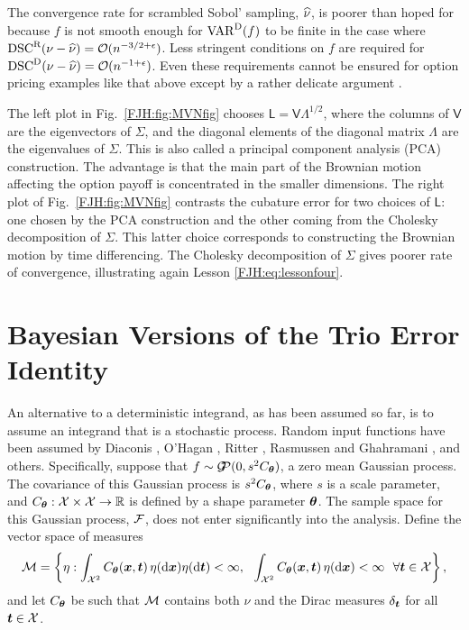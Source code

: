\documentclass[graybox,footinfo]{svmult}
\DeclareMathOperator{\disc}{DSC}
\DeclareMathOperator{\Var}{VAR}
\DeclareMathOperator{\GP}{\cg\!\!\cp}
\begin{document}
The convergence rate for scrambled Sobol' sampling, $\widehat{\nu}$,  is poorer than hoped for 
because 
$f$ is not smooth enough for $\Var^{\Dt}(f)$ to be finite in the case 
where $\disc^\Rn(\nu - \hnu) = \Order(n^{-3/2 +\epsilon})$.  Less 
stringent conditions on $f$ are required for $\disc^\Dt(\nu - \hnu) = 
\Order(n^{-1 +\epsilon})$.  Even these requirements cannot 
be ensured for option pricing examples like that above except by a rather delicate 
argument \cite{GriKuoSlo10, GriKuoSlo16}.

\begin{FJHLesson}
	\FJHLessonFive
\end{FJHLesson}

The left plot in Fig.\ \ref{FJH:fig:MVNfig} chooses $\mathsf{L} = 
\mathsf{V}\mathsf{\Lambda}^{1/2}$, where the columns of $\mathsf{V}$ are the 
eigenvectors of $\mathsf{\Sigma}$, and the diagonal elements of the diagonal matrix  
$\mathsf{\Lambda}$ are the eigenvalues of $\mathsf{\Sigma}$.  This is also called a 
principal component analysis (PCA) construction.  The advantage is that the main part of 
the 
Brownian motion affecting the option payoff is concentrated in the smaller dimensions.  
The right plot of Fig.\ 
\ref{FJH:fig:MVNfig} contrasts the cubature error for two choices of  $\mathsf{L}$:  one 
chosen by the PCA construction and the other coming from the Cholesky decomposition 
of $\mathsf{\Sigma}$.  This latter choice corresponds to constructing the Brownian 
motion by time 
differencing.  The Cholesky decomposition of $\mathsf{\Sigma}$ gives poorer rate of 
convergence, illustrating again Lesson \ref{FJH:eq:lessonfour}.


\section{Bayesian Versions of the Trio Error Identity}
An alternative to a deterministic integrand, as has been assumed so far, is to assume an 
integrand that is a stochastic process.  Random input functions have been assumed by 
Diaconis \cite{Dia88a}, O'Hagan \cite{OHa91a}, Ritter \cite{Rit00a}, Rasmussen and 
Ghahramani \cite{RasGha03a}, and others. Specifically, suppose that $f \sim \GP (0, 
s^2C_{\bstheta})$, a zero mean Gaussian process.  The covariance of 
this  Gaussian process is $s^2C_{{\boldsymbol{\theta}}}$, where $s$ is a scale parameter, and 
$C_{{\boldsymbol{\theta}}}:\mathcal{X} \times \mathcal{X} \to {\mathbb{R}}$ is defined by a shape parameter ${\boldsymbol{\theta}}$.  The 
sample space for this Gaussian process, ${\mathcal{F}}$, does not enter significantly into the 
analysis.  Define the vector space of measures 
\begin{equation*}
\mathcal{M} = \left\{\eta :  \int_{{\mathcal{X}}^2} C_{\boldsymbol{\theta}}({\boldsymbol{x}},{\boldsymbol{t}}) 
\, \eta(\mathrm{d} {\boldsymbol{x}}) \eta(\mathrm{d} {\boldsymbol{t}}) < \infty, \ \ \int_{{\mathcal{X}}^2} C_{\boldsymbol{\theta}}({\boldsymbol{x}},{\boldsymbol{t}}) 
\, \eta(\mathrm{d} {\boldsymbol{x}}) < \infty \ \ \forall {\boldsymbol{t}} \in \mathcal{X} \right \},
\end{equation*}
and let $C_{{\boldsymbol{\theta}}}$ be such that $\mathcal{M}$ contains both $\nu$ and the Dirac measures 
$\delta_{{\boldsymbol{t}}}$ for all ${\boldsymbol{t}} \in \mathcal{X}$. 
\end{document}

